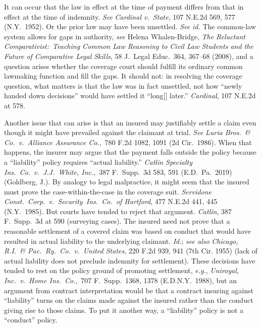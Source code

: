 \documentclass[
  12pt,
  letterpaper,
]{scrartcl}
\begin{document}
It can occur that the law in effect at the time of payment differs from that in
effect at the time of indemnity. \textit{See} \textit{Cardinal v.~State}, 107
N.E.2d 569, 577 (N.Y.~1952). Or the prior law may have been unsettled.
\textit{See} \textit{id.} The common-law system allows for gaps in authority,
\textit{see} Helena Whalen-Bridge, \textit{The Reluctant
Comparativist:~Teaching Common Law Reasoning to Civil Law Students and the
Future of Comparative Legal Skills}, 58 J.~Legal Educ.~364, 367--68 (2008), and
a question arises whether the coverage court should fulfill its ordinary common
lawmaking function and fill the gaps. It should not: in resolving the coverage question, what matters is
that the law was in fact unsettled, not how ``newly handed down decisions''
would have settled it ``long[] later.'' \textit{Cardinal}, 107 N.E.2d at
578.

Another issue that can arise is that an insured may justifiably settle a claim
even though it might have prevailed against the claimant at trial. \textit{See}
\textit{Luria Bros.~\& Co.~v.~Alliance Assurance Co.},~780 F.2d 1082, 1091 (2d
Cir.~1986). When that happens, the insurer may argue that the payment falls
outside the policy because a ``liability'' policy requires ``actual
liability.'' \textit{Catlin Specialty Ins.~Co.~v.~J.J.~White, Inc.},~387
F.~Supp.~3d 583, 591 (E.D.~Pa.~2019) (Goldberg, J.). By analogy to legal
malpractice, it might seem that the insured must prove the case-within-the-case
in the coverage suit. \textit{Servidone Const.~Corp.~v.~Security~Ins.~Co.~of
Hartford}, 477 N.E.2d 441, 445 (N.Y.~1985). But courts have tended to reject
that argument. \textit{Catlin}, 387 F.~Supp.~3d at 590 (surveying cases). The
insured need not prove that a reasonable settlement of a covered claim was
based on conduct that would have resulted in actual liability to the underlying
claimant. \textit{Id.}; \textit{see also} \textit{Chicago, R.I.~\&
Pac.~Ry.~Co.~v.~United States}, 220 F.2d 939, 941 (7th Cir. 1955) (lack of
actual liability does not preclude indemnity for settlement). These decisions
have tended to rest on the policy ground of promoting settlement,
\textit{e.g.}, \textit{Uniroyal, Inc.~v.~Home Ins.~Co.},~707 F.~Supp.~1368,
1378 (E.D.N.Y.~1988), but an argument from contract interpretation would be
that a contract insuring against ``liability'' turns on the claims made
against the insured rather than the conduct giving rise to those claims. To put
it another way, a ``liability'' policy is not a ``conduct'' policy.
\end{document}
